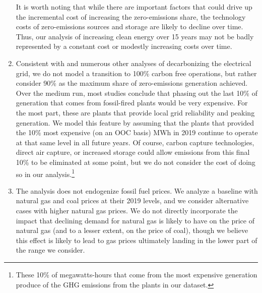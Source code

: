 \documentclass[12pt]{article}
\begin{document}
\begin{enumerate}
    It is worth noting that while there are important factors that could drive up the incremental cost of increasing the zero-emissions share, the technology costs of zero-emissions sources and storage are likely to decline over time. Thus, our analysis of increasing clean energy over 15 years may not be badly represented by a constant cost or modestly increasing costs over time.
    
    \item Consistent with \cite{phadke20202035} and numerous other analyses of decarbonizing the electrical grid, we do not model a transition to 100\% carbon free operations, but rather consider 90\% as the maximum share of zero-emissions generation achieved.  Over the medium run, most studies conclude that phasing out the last 10\% of generation that comes from fossil-fired plants would be very expensive. For the most part, these are plants that provide local grid reliability and peaking generation. We model this feature by assuming that the plants that provided the 10\% most expensive (on an OOC basis) MWh in 2019 continue to operate at that same level in all future years. Of course, carbon capture technologies, direct air capture, or increased storage could allow emissions from this final 10\% to be eliminated at some point, but we do not consider the cost of doing so in our analysis.\footnote{These 10\% of megawatts-hours that come from the most expensive generation produce of the GHG emissions from the plants in our dataset.}
    
    \item The analysis does not endogenize fossil fuel prices. We analyze a baseline with natural gas and coal prices at their 2019 levels, and we consider alternative cases with higher natural gas prices. We do not directly incorporate the impact that declining demand for natural gas is likely to have on the price of natural gas (and to a lesser extent, on the price of coal), though we believe this effect is likely to lead to gas prices ultimately landing in the lower part of the range we consider.
    

\end{enumerate}
\end{document}
